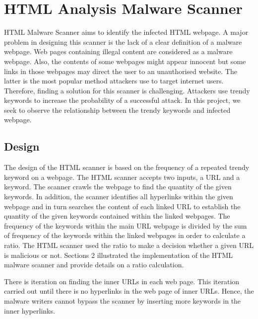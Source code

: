 \section{HTML Analysis Malware Scanner}

HTML Malware Scanner aims to identify the infected HTML webpage. A major problem in designing this scanner is the lack of a clear definition of a malware webpage. Web pages containing illegal content are considered as a malware webpage. Also, the contents of some webpages might appear innocent but some links in those webpages may direct the user to an unauthorised website. The latter is the most popular method attackers use to target internet users. Therefore, finding a solution for this scanner is challenging. Attackers use trendy keywords to increase the probability of a successful attack. In this project, we seek to observe the relationship between the trendy keywords and infected webpage.

\subsection{Design}

The design of the HTML scanner is based on the frequency of a repeated trendy keyword on a webpage. The HTML scanner accepts two inputs, a URL and a keyword. The scanner crawls the webpage to find the quantity of the given keywords. In addition, the scanner identifies all hyperlinks within the given webpage and in turn searches the content of each linked URL to establish the quantity of the given keywords contained within the linked webpages. The frequency of the keywords within the main URL webpage is divided by the sum of frequency of the keywords within the linked webpages in order to calculate a ratio. The HTML scanner used the ratio to make a decision whether a given URL is malicious or not. Sections 2 illustrated the implementation of the HTML malware scanner and provide details on a ratio calculation.

There is iteration on finding the inner URLs in each web page. This iteration carried out until there is no hyperlinks in the web page of inner URLs. Hence, the malware writers cannot bypass the scanner by inserting more keywords in the inner hyperlinks. 
